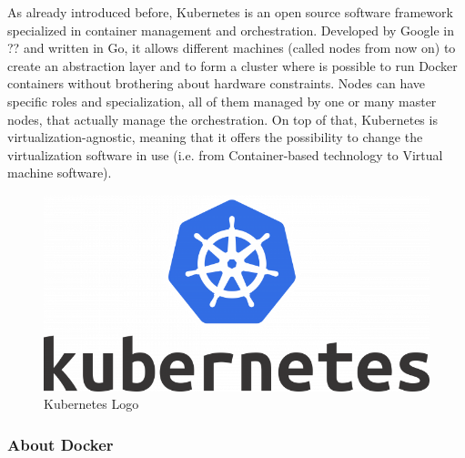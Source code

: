 \documentclass[10pt]{book}
\begin{document}
As already introduced before, Kubernetes is an open source software framework
specialized in container management and orchestration. Developed by Google in
?? and written in Go, it allows different
machines (called nodes from now on) to create an abstraction layer and to form a
cluster where is possible to run Docker containers without brothering about
hardware constraints. Nodes can have specific roles and specialization, all of
them managed by one or many master nodes, that actually manage the
orchestration. On top of that, Kubernetes is virtualization-agnostic, meaning
that it offers the possibility to change the virtualization software in use
(i.e. from Container-based technology to Virtual machine software).
\begin{figure}[h]
 \centering \includegraphics[scale=0.35]{kubernetes_logo}
 \caption{Kubernetes Logo}
 \label{chap:intro:img:k8s_logo}
\end{figure}


\subsubsection{About Docker}
\end{document}
